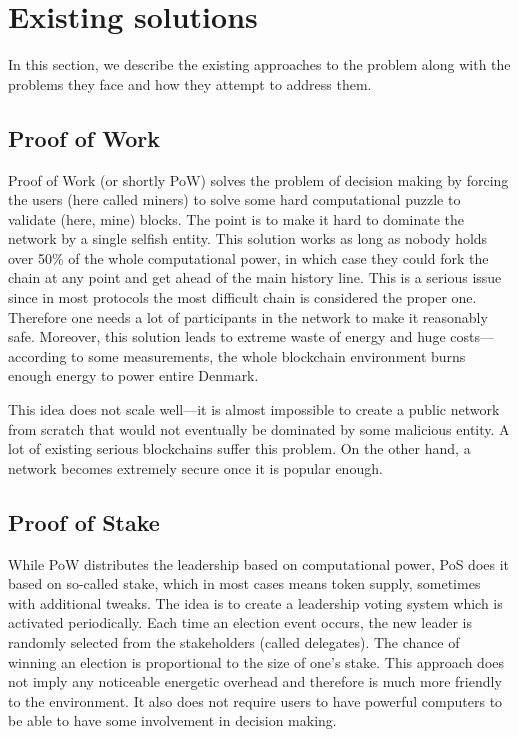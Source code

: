 \section{Existing solutions}

In this section, we describe the existing approaches to the problem along with
the problems they face and how they attempt to address them.

\subsection{Proof of Work}

Proof of Work (or shortly PoW) solves the problem of decision making by forcing
the users (here called miners) to solve some hard computational puzzle to
validate (here, mine) blocks\cite{bitcoin}. The point is to make it hard to
dominate the network by a single selfish entity. This solution works as long as
nobody holds over 50\% of the whole computational power, in which case they
could fork the chain at any point and get ahead of the main history line. This
is a serious issue since in most protocols the most difficult chain is
considered the proper one. Therefore one needs a lot of participants in the
network to make it reasonably safe. Moreover, this solution leads to extreme
waste of energy and huge costs---according to some measurements, the whole
blockchain environment burns enough energy to power entire
Denmark\cite{bitcoin_energy}.

This idea does not scale well---it is almost impossible to create a public
network from scratch that would not eventually be dominated by some malicious
entity. A lot of existing serious blockchains suffer this
problem\cite{51attack}. On the other hand, a network becomes extremely secure
once it is popular enough.

\subsection{Proof of Stake}

While PoW distributes the leadership based on computational power, PoS does it
based on so-called stake, which in most cases means token supply, sometimes with
additional tweaks\cite{peercoin}\cite{cryptocurr_without_pow}. The idea is to
create a leadership voting system which is activated periodically. Each time an
election event occurs, the new leader is randomly selected from the stakeholders
(called delegates). The chance of winning an election is proportional to the
size of one's stake. This approach does not imply any noticeable energetic
overhead and therefore is much more friendly to the environment. It also does
not require users to have powerful computers to be able to have some involvement
in decision making.

